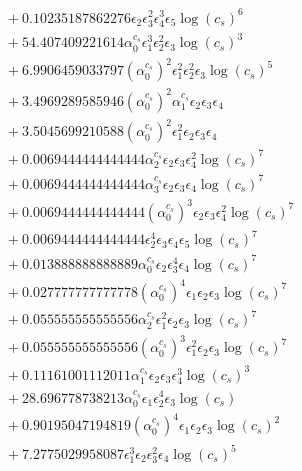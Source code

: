 \documentclass[10pt]{article}
\begin{document}
\begin{align*}
&{}  + 0.10235187862276 \epsilon_{2} \epsilon_{3}^{2} \epsilon_{4}^{3} \epsilon_{5} \log{\left(c_{s} \right)}^{6} \\
&{}  + 54.407409221614 \alpha_{0}^{c_s} \epsilon_{1}^{3} \epsilon_{2}^{2} \epsilon_{3} \log{\left(c_{s} \right)}^{3} \\
&{}  + 6.9906459033797 \left(\alpha_{0}^{c_s}\right)^{2} \epsilon_{1}^{2} \epsilon_{2}^{2} \epsilon_{3} \log{\left(c_{s} \right)}^{5} \\
&{}  + 3.4969289585946 \left(\alpha_{0}^{c_s}\right)^{2} \alpha_{1}^{c_s} \epsilon_{2} \epsilon_{3} \epsilon_{4} \\
&{}  + 3.5045699210588 \left(\alpha_{0}^{c_s}\right)^{2} \epsilon_{1}^{2} \epsilon_{2} \epsilon_{3} \epsilon_{4} \\
&{}  + 0.0069444444444444 \alpha_{2}^{c_s} \epsilon_{2} \epsilon_{3} \epsilon_{4}^{2} \log{\left(c_{s} \right)}^{7} \\
&{}  + 0.0069444444444444 \alpha_{3}^{c_s} \epsilon_{2} \epsilon_{3} \epsilon_{4} \log{\left(c_{s} \right)}^{7} \\
&{}  + 0.0069444444444444 \left(\alpha_{0}^{c_s}\right)^{3} \epsilon_{2} \epsilon_{3} \epsilon_{4}^{2} \log{\left(c_{s} \right)}^{7} \\
&{}  + 0.0069444444444444 \epsilon_{2}^{4} \epsilon_{3} \epsilon_{4} \epsilon_{5} \log{\left(c_{s} \right)}^{7} \\
&{}  + 0.013888888888889 \alpha_{0}^{c_s} \epsilon_{2} \epsilon_{3}^{4} \epsilon_{4} \log{\left(c_{s} \right)}^{7} \\
&{}  + 0.027777777777778 \left(\alpha_{0}^{c_s}\right)^{4} \epsilon_{1} \epsilon_{2} \epsilon_{3} \log{\left(c_{s} \right)}^{7} \\
&{}  + 0.055555555555556 \alpha_{2}^{c_s} \epsilon_{1}^{2} \epsilon_{2} \epsilon_{3} \log{\left(c_{s} \right)}^{7} \\
&{}  + 0.055555555555556 \left(\alpha_{0}^{c_s}\right)^{3} \epsilon_{1}^{2} \epsilon_{2} \epsilon_{3} \log{\left(c_{s} \right)}^{7} \\
&{}  + 0.11161001112011 \alpha_{1}^{c_s} \epsilon_{2} \epsilon_{3} \epsilon_{4}^{3} \log{\left(c_{s} \right)}^{3} \\
&{}  + 28.696778738213 \alpha_{0}^{c_s} \epsilon_{1} \epsilon_{2}^{4} \epsilon_{3} \log{\left(c_{s} \right)} \\
&{}  + 0.90195047194819 \left(\alpha_{0}^{c_s}\right)^{4} \epsilon_{1} \epsilon_{2} \epsilon_{3} \log{\left(c_{s} \right)}^{2} \\
&{}  + 7.2775029958087 \epsilon_{1}^{3} \epsilon_{2} \epsilon_{3}^{2} \epsilon_{4} \log{\left(c_{s} \right)}^{5} \\

\end{align*}
\end{document}
